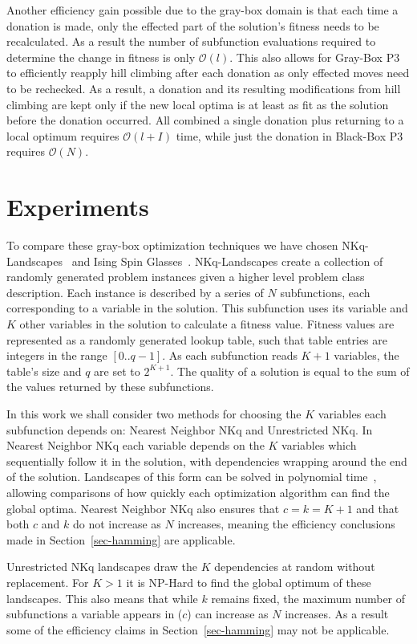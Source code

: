 \documentclass{sig-alternate}
\newcommand{\BigO}[1]{$\mathcal{O}{(#1)}$}
\begin{document}
Another efficiency gain possible due to the gray-box domain is that each time a
donation is made, only the effected part of the solution's fitness needs to be
recalculated. As a result the number of subfunction evaluations required
to determine the change in fitness is only \BigO{l}. This also
allows for Gray-Box P3 to efficiently reapply hill climbing after each
donation as only effected moves need to be rechecked. As a result, a donation
and its resulting modifications from hill climbing are kept only if the
new local optima is at least as fit as the solution before the donation occurred.
All combined a single donation plus returning to a local optimum requires \BigO{l + I} time,
while just the donation in Black-Box P3 requires \BigO{N}.

\section{Experiments}
\label{sec-experiments}
To compare these gray-box optimization techniques we have chosen
NKq-Landscapes~\cite{chicano:2014:ball} and Ising Spin Glasses~\cite{saul:1994:spinglass}. NKq-Landscapes create
a collection of randomly generated problem instances given a
higher level problem class description. Each instance is described
by a series of $N$ subfunctions, each corresponding to a variable
in the solution. This subfunction uses its variable and $K$ other
variables in the solution to calculate a fitness value. Fitness values
are represented as a randomly generated lookup table, such that table
entries are integers in the range $[0..q-1]$. As each subfunction reads
$K+1$ variables, the table's size and $q$ are set to $2^{K+1}$. The quality
of a solution is equal to the sum of the values returned by these subfunctions.

In this work we shall consider two methods for choosing the $K$ variables
each subfunction depends on: Nearest Neighbor NKq and Unrestricted NKq.
In Nearest Neighbor NKq each variable depends on the $K$ variables which sequentially follow
it in the solution, with dependencies wrapping around the end of the solution.
Landscapes of this form can be solved in polynomial
time~\cite{wright:2000:solvingnk}, allowing comparisons of how quickly each optimization
algorithm can find the global optima. Nearest Neighbor NKq also ensures that $c=k=K+1$
and that both $c$ and $k$ do not increase as $N$ increases, meaning the efficiency
conclusions made in Section~\ref{sec-hamming} are applicable.

Unrestricted NKq landscapes draw the $K$ dependencies at random without replacement. For $K > 1$ it is
NP-Hard to find the global optimum of these landscapes. This also means that while
$k$ remains fixed, the maximum number of subfunctions a variable appears in ($c$) can increase
as $N$ increases. As a result some of the efficiency claims in Section~\ref{sec-hamming}
may not be applicable.
\end{document}
